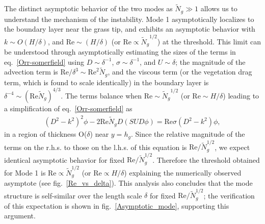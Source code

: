 \documentclass[aps,prl,twocolumn,superscriptaddress,10pt]{revtex4-1}  %
\newcommand{\hg}{h_g}
\newcommand{\Rey}{\text{Re}}
\newcommand{\Ndg}{\tilde{N}_g}
\begin{document}
The distinct asymptotic behavior of the two modes as $\Ndg \gg 1$ allows us to understand the mechanism of the instability. 
Mode 1 asymptotically localizes to the boundary layer near the grass tip, and exhibits an asymptotic behavior with $k \sim O(H/\delta)$, and $\Rey \sim (H/\delta)$ (or $\Rey \propto {\Ndg}^{1/2}$) at the threshold. 
This limit can be understood through asymptotically estimating the sizes of the terms in eq.~\eqref{Orr-somerfield} using $D\sim \delta^{-1}$, $\sigma \sim \delta^{-1}$, and $U\sim \delta$; the magnitude of the advection term is $\Rey/\delta^3 \sim \Rey^2 \Ndg $, and the viscous term (or the vegetation drag term, which is found to scale identically) in the boundary layer is $\delta^{-4} \sim (\Rey \Ndg)^{4/3}$. 
The terms balance when $\Rey \sim {\Ndg}^{1/2}$ (or $\Rey \sim H/\delta$) leading to a simplification of eq.~\eqref{Orr-somerfield} as
\begin{align}
(D^2-k^2)^2 \phi- 2 \Rey \Ndg D( SUD\phi) = \Rey \sigma (D^2-k^2)\phi,
\label{eqn:mode1asymp}
\end{align} 
in a region of thickness O($\delta$) near $y=\hg$.
Since the relative magnitude of the terms on the r.h.s. to those on the l.h.s. of this equation is $\Rey/\Ndg^{1/2}$, we expect identical asymptotic behavior for fixed $\Rey/\Ndg^{1/2}$. Therefore the threshold obtained for Mode 1 is $\Rey \propto \Ndg^{1/2}$ (or $\Rey \propto H/\delta$) explaining the numerically observed asymptote (see fig.~\ref{Re_vs_delta}). 
This analysis also concludes that the mode structure is self-similar over the length scale $\delta$ for fixed $\Rey/\Ndg^{1/2}$; the verification of this expectation is shown in fig.~\ref{Asymptotic_mode}, supporting this argument.
\end{document}
